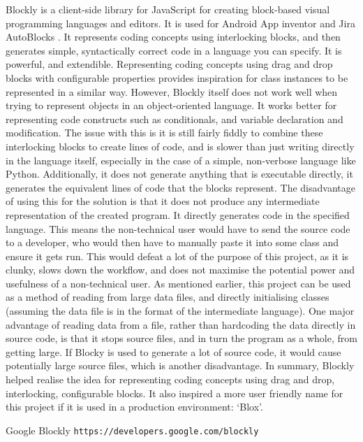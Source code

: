 \documentclass[
11pt,
english,
singlespacing,
headsepline,
]{MastersDoctoralThesis}
\begin{document}
Blockly is a client-side library for JavaScript for creating block-based visual programming languages and editors. It is used for Android App inventor and Jira AutoBlocks \cite{blockly}. It represents coding concepts using interlocking blocks, and then generates simple, syntactically correct code in a language you can specify. It is powerful, and extendible. Representing coding concepts using drag and drop blocks with configurable properties provides inspiration for class instances to be represented in a similar way. However, Blockly itself does not work well when trying to represent objects in an object-oriented language. It works better for representing code constructs such as conditionals, and variable declaration and modification. The issue with this is it is still fairly fiddly to combine these interlocking blocks to create lines of code, and is slower than just writing directly in the language itself, especially in the case of a simple, non-verbose language like Python. Additionally, it does not generate anything that is executable directly, it generates the equivalent lines of code that the blocks represent. The disadvantage of using this for the solution is that it does not produce any intermediate representation of the created program. It directly generates code in the specified language. This means the non-technical user would have to send the source code to a developer, who would then have to manually paste it into some class and ensure it gets run. This would defeat a lot of the purpose of this project, as it is clunky, slows down the workflow, and does not maximise the potential power and usefulness of a non-technical user. As mentioned earlier, this project can be used as a method of reading from large data files, and directly initialising classes (assuming the data file is in the format of the intermediate language). One major advantage of reading data from a file, rather than hardcoding the data directly in source code, is that it stops source files, and in turn the program as a whole, from getting large. If Blocky is used to generate a lot of source code, it would cause potentially large source files, which is another disadvantage. In summary, Blockly helped realise the idea for representing coding concepts using drag and drop, interlocking, configurable blocks. It also inspired a more user friendly name for this project if it is used in a production environment: ‘Blox’.

\begin{thebibliography}{9}

Google Blockly \texttt{https://developers.google.com/blockly}

\end{thebibliography}
\end{document}
